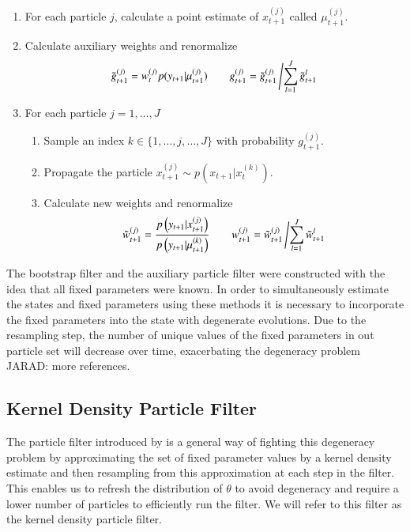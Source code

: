 \documentclass{elsarticle}
\newcommand{\jarad}[1]{{\color{red}JARAD: #1}}
\begin{document}
\begin{enumerate}
\item For each particle $j$, calculate a point estimate of $x_{t+1}^{(j)}$ called $\mu_{t+1}^{(j)}$.  %
\item Calculate auxiliary weights and renormalize
\[ \tilde{g}_{t+1}^{(j)} = w_t^{(j)} p(y_{t+1}|\mu_{t+1}^{(j)}) \qquad g_{t+1}^{(j)} = \tilde{g}_{t+1}^{(j)}\left/\sum_{l=1}^J \tilde{g}_{t+1}^l\right. \]
\item For each particle $j=1,\ldots,J$
	\begin{enumerate}
	\item Sample an index $k\in\{1,\ldots,j,\ldots,J\}$ with probability $g_{t+1}^{(j)}$.
	\item Propagate the particle $x_{t+1}^{(j)}\sim p\left(x_{t+1}|x_t^{(k)}\right)$.
	\item Calculate new weights and renormalize
\[\tilde{w}_{t+1}^{(j)} = \frac{p\left(y_{t+1}|x_{t+1}^{(j)}\right)}{p\left(y_{t+1}|\mu_{t+1}^{(k)}\right)} \qquad w_{t+1}^{(j)} = \tilde{w}_{t+1}^{(j)}\left/\sum_{l=1}^J \tilde{w}_{t+1}^l \right.\]
	\end{enumerate}
\end{enumerate}

The bootstrap filter and the auxiliary particle filter were constructed with the idea that all fixed parameters were known. In order to simultaneously estimate the states and fixed parameters using these methods it is necessary to incorporate the fixed parameters into the state with degenerate evolutions. Due to the resampling step, the number of unique values of the fixed parameters in out particle set will decrease over time, exacerbating the degeneracy problem \citep{Liu:West:comb:2001} \jarad{more references}.

\subsection{Kernel Density Particle Filter}

The particle filter introduced by \cite{Liu:West:comb:2001} is a general way of fighting this degeneracy problem by approximating the set of fixed parameter values by a kernel density estimate and then resampling from this approximation at each step in the filter. This enables us to refresh the distribution of $\theta$ to avoid degeneracy and require a lower number of particles to efficiently run the filter. We will refer to this filter as the kernel density particle filter.
\end{document}
